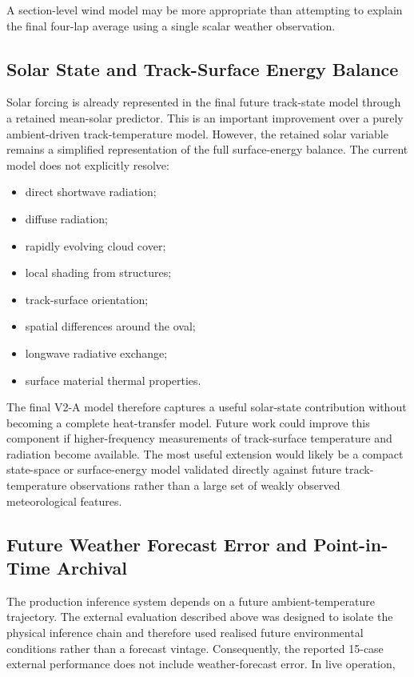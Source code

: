 A section-level wind model may be more appropriate than attempting to explain the final four-lap average using a single scalar weather observation.

\subsection{Solar State and Track-Surface Energy Balance}
Solar forcing is already represented in the final future track-state model through a retained mean-solar predictor. This is an important improvement over a purely ambient-driven track-temperature model. However, the retained solar variable remains a simplified representation of the full surface-energy balance. The current model does not explicitly resolve:

\begin{itemize}
\item direct shortwave radiation;
\item diffuse radiation;
\item rapidly evolving cloud cover;
\item local shading from structures;
\item track-surface orientation;
\item spatial differences around the oval;
\item longwave radiative exchange;
\item surface material thermal properties.
\end{itemize}

The final V2-A model therefore captures a useful solar-state contribution without becoming a complete heat-transfer model. Future work could improve this component if higher-frequency measurements of track-surface temperature and radiation become available. The most useful extension would likely be a compact state-space or surface-energy model validated directly against future track-temperature observations rather than a large set of weakly observed meteorological features.

\subsection{Future Weather Forecast Error and Point-in-Time Archival}
The production inference system depends on a future ambient-temperature trajectory. The external evaluation described above was designed to isolate the physical inference chain and therefore used realised future environmental conditions rather than a forecast vintage. Consequently, the reported 15-case external performance does not include weather-forecast error. In live operation,

